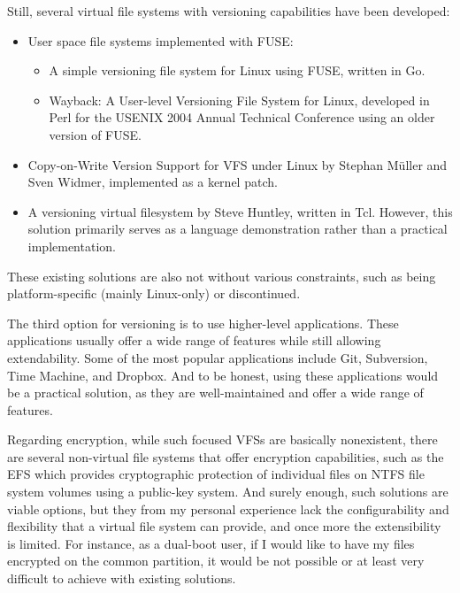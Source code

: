 Still, several virtual file systems with versioning capabilities have been developed:

\begin{itemize}
    \item User space file systems implemented with FUSE:
    \begin{itemize}
        \item A simple versioning file system for Linux using FUSE\cite{simple_vfs}, written in Go.
        \item Wayback: A User-level Versioning File System for Linux\cite{wayback_vfs}, developed in Perl for the USENIX 2004 Annual Technical Conference using an older version of FUSE\@.
    \end{itemize}
    \item Copy-on-Write Version Support for VFS under Linux by Stephan Müller and Sven Widmer\cite{vvfs}, implemented as a kernel patch.
    \item A versioning virtual filesystem by Steve Huntley\cite{huntley_vvfs}, written in Tcl.
    However, this solution primarily serves as a language demonstration rather than a practical implementation.
\end{itemize}

These existing solutions are also not without various constraints, such as being platform-specific (mainly Linux-only) or discontinued.

The third option for versioning is to use higher-level applications.
These applications usually offer a wide range of features while still allowing extendability.
Some of the most popular applications include Git, Subversion, Time Machine, and Dropbox.
And to be honest, using these applications would be a practical solution, as they are well-maintained and offer a wide range of features.

Regarding encryption, while such focused VFSs are basically nonexistent, there are several non-virtual file systems that offer encryption capabilities, such as the EFS which provides cryptographic protection of individual files on NTFS file system volumes using a public-key system.
And surely enough, such solutions are viable options, but they from my personal experience lack the configurability and flexibility that a virtual file system can provide, and once more the extensibility is limited.
For instance, as a dual-boot user, if I would like to have my files encrypted on the common partition, it would be not possible or at least very difficult to achieve with existing solutions.

